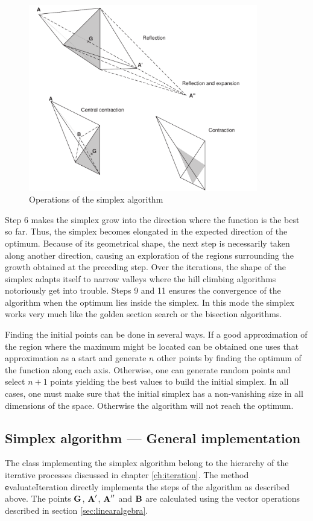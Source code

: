 \begin{figure}
\centering\includegraphics[width=10cm]{Figures/Simplex}
\caption{Operations of the simplex
algorithm}\label{fig:simplexsample}
\end{figure}
Step 6 makes the simplex grow into the direction where the
function is the best so far. Thus, the simplex becomes elongated
in the expected direction of the optimum. Because of its
geometrical shape, the next step is necessarily taken along
another direction, causing an exploration of the regions
surrounding the growth obtained at the preceding step. Over the
iterations, the shape of the simplex adapts itself to narrow
valleys where the hill climbing algorithms notoriously get into
trouble. Steps 9 and 11 ensures the convergence of the algorithm
when the optimum lies inside the simplex. In this mode the simplex
works very much like the golden section search or the bisection
algorithms.

Finding the initial points can be done in several ways. If a good
approximation of the region where the maximum might be located can
be obtained one uses that approximation as a start and generate
$n$ other points by finding the optimum of the function along each
axis. Otherwise, one can generate random points and select $n+1$
points yielding the best values to build the initial simplex. In
all cases, one must make sure that the initial simplex has a
non-vanishing size in all dimensions of the space. Otherwise the
algorithm will not reach the optimum.

\subsection{Simplex algorithm --- General implementation}
The class implementing the simplex algorithm belong to the
hierarchy of the iterative processes discussed in chapter
\ref{ch:iteration}. The method {\texttt evaluateIteration} directly
implements the steps of the algorithm as described above. The
points ${\textbf G}$, ${\textbf A}^{\prime}$, ${\textbf A}^{\prime\prime}$ and
${\textbf B}$ are calculated using the vector operations described in
section \ref{sec:linearalgebra}.

